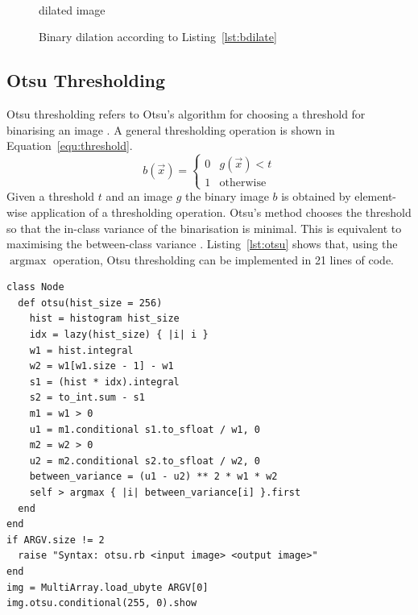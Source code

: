 \documentclass[12pt,a4paper,oneside,openright]{book}
\newcommand{\equ}[1]{Equation~\ref{equ:#1}}
\newcommand{\lst}[1]{Listing~\ref{lst:#1}}
\begin{document}
\begin{CJK}{UTF8}{}
\begin{figure}[htbp]
\begin{center}
    \begin{minipage}[t]{.3\textwidth}
      \begin{center}
        \\
        dilated image
      \end{center}
    \end{minipage}
    \caption{Binary dilation according to \lst{bdilate}\label{fig:bdilate}}
  \end{center}
\end{figure}

\subsection{Otsu Thresholding}
Otsu thresholding refers to Otsu's algorithm for choosing a threshold for binarising an image \citep{otsu}. A general thresholding operation is shown in \equ{threshold}.
\begin{equation}\label{equ:threshold}
  b(\vec{x})=\left\{\begin{array}{ll}0&g(\vec{x})<t\\1&\mathrm{otherwise}\end{array}\right.
\end{equation}
Given a threshold $t$ and an image $g$ the binary image $b$ is obtained by element-wise application of a thresholding operation. Otsu's method chooses the threshold so that the in-class variance of the binarisation is minimal. This is equivalent to maximising the between-class variance \citep{otsu}. \lst{otsu} shows that, using the $\operatorname{argmax}$ operation, Otsu thresholding can be implemented in 21 lines of code.
\lstset{language=Ruby,frame=single,numbers=left}
\begin{lstlisting}[float,caption={Otsu thresholding},escapechar=\$,label=lst:otsu]
class Node
  def otsu(hist_size = 256)
    hist = histogram hist_size
    idx = lazy(hist_size) { |i| i }
    w1 = hist.integral
    w2 = w1[w1.size - 1] - w1
    s1 = (hist * idx).integral
    s2 = to_int.sum - s1
    m1 = w1 > 0
    u1 = m1.conditional s1.to_sfloat / w1, 0
    m2 = w2 > 0
    u2 = m2.conditional s2.to_sfloat / w2, 0
    between_variance = (u1 - u2) ** 2 * w1 * w2
    self > argmax { |i| between_variance[i] }.first
  end
end
if ARGV.size != 2
  raise "Syntax: otsu.rb <input image> <output image>"
end
img = MultiArray.load_ubyte ARGV[0]
img.otsu.conditional(255, 0).show
\end{lstlisting}


\end{CJK}
\end{document}
